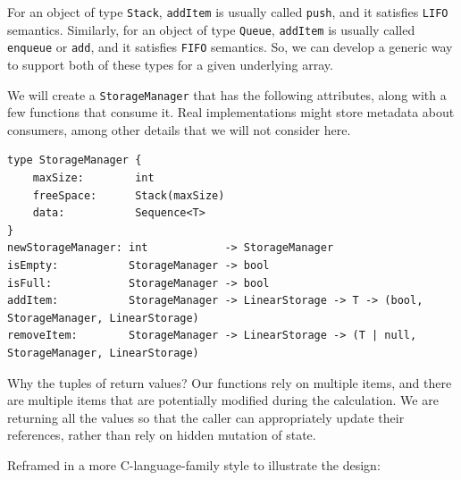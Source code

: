 \documentclass[10pt,letterpaper,final]{report}
\begin{document}
For an object of type \texttt{Stack}, \texttt{addItem} is usually called \texttt{push}, and it satisfies \texttt{LIFO} semantics. Similarly, for an object of type \texttt{Queue}, \texttt{addItem} is usually called \texttt{enqueue} or \texttt{add}, and it satisfies \texttt{FIFO} semantics. So, we can develop a generic way to support both of these types for a given underlying array.

\medskip

We will create a \texttt{StorageManager} that has the following attributes, along with a few functions that consume it. Real implementations might store metadata about consumers, among other details that we will not consider here.

\begin{verbatim}
type StorageManager {
    maxSize:        int
    freeSpace:      Stack(maxSize)
    data:           Sequence<T>
}
newStorageManager: int            -> StorageManager
isEmpty:           StorageManager -> bool
isFull:            StorageManager -> bool
addItem:           StorageManager -> LinearStorage -> T -> (bool, StorageManager, LinearStorage)
removeItem:        StorageManager -> LinearStorage -> (T | null, StorageManager, LinearStorage)
\end{verbatim}

Why the tuples of return values? Our functions rely on multiple items, and there are multiple items that are potentially modified during the calculation. We are returning all the values so that the caller can appropriately update their references, rather than rely on hidden mutation of state.

\pagebreak
\noindent Reframed in a more C-language-family style to illustrate the design:
\end{document}
